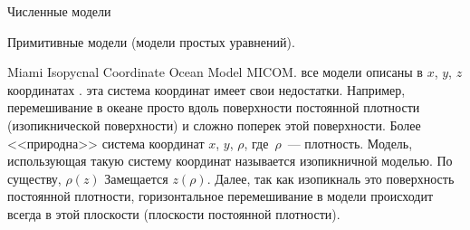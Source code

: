 \begin{chapter}{Численные модели}
\begin{section}{Примитивные модели (модели простых уравнений).}
\begin{figure}[t!]
\end{figure}
%

\begin{paragraph}{Miami Isopycnal Coordinate Ocean Model MICOM.}
все модели описаны в $x$, $y$, $z$ координатах . эта система координат имеет
свои недостатки. Например, перемешивание в океане просто вдоль
поверхности постоянной плотности (изопикнической поверхности) и сложно
поперек этой поверхности. Более <<природна>> система координат $x$, $y$, $\rho$,
где~$\rho$~--- плотность. Модель, использующая такую систему координат
называется изопикничной моделью. По существу, $\rho(z)$ Замещается
$z(\rho)$. Далее, так как изопикналь это поверхность постоянной плотности,
горизонтальное перемешивание в модели происходит всегда в этой
плоскости (плоскости постоянной плотности).
%


\end{paragraph}
\end{section}
\end{chapter}
